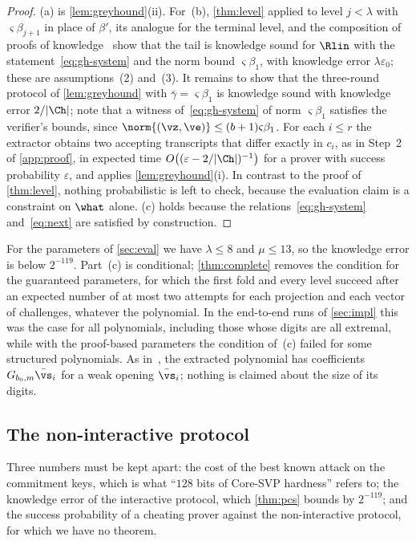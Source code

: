\begin{proof}
(a) is \cref{lem:greyhound}(ii). For~(b), \cref{thm:level} applied to level $j<\lambda$ with $\varsigma\beta_{j+1}$ in place of $\beta'$, its analogue for the terminal level, and the composition of proofs of knowledge~\cite{BS23} show that the tail is knowledge sound for $\Rlin$ with the statement~\eqref{eq:gh-system} and the norm bound $\varsigma\beta_1$, with knowledge error $\lambda\varepsilon_0$; these are assumptions~(2) and~(3). It remains to show that the three-round protocol of \cref{lem:greyhound} with $\bar\gamma=\varsigma\beta_1$ is knowledge sound with knowledge error $2/\lvert\Ch\rvert$; note that a witness of~\eqref{eq:gh-system} of norm $\varsigma\beta_1$ satisfies the verifier's bounds, since $\norm{(\vz,\ve)}\le(b+1)\varsigma\beta_1$. For each $i\le r$ the extractor obtains two accepting transcripts that differ exactly in $c_i$, as in Step~2 of \cref{app:proof}, in expected time $O\bigl((\varepsilon-2/\lvert\Ch\rvert)^{-1}\bigr)$ for a prover with success probability $\varepsilon$, and applies \cref{lem:greyhound}(i). In contrast to the proof of \cref{thm:level}, nothing probabilistic is left to check, because the evaluation claim is a constraint on $\what$ alone. (c) holds because the relations~\eqref{eq:gh-system} and~\eqref{eq:next} are satisfied by construction.
\end{proof}

For the parameters of \cref{sec:eval} we have $\lambda\le8$ and $\mu\le13$, so the knowledge error is below $2^{-119}$. Part~(c) is conditional; \cref{thm:complete} removes the condition for the guaranteed parameters, for which the first fold and every level succeed after an expected number of at most two attempts for each projection and each vector of challenges, whatever the polynomial. In the end-to-end runs of \cref{sec:impl} this was the case for all polynomials, including those whose digits are all extremal, while with the proof-based parameters the condition of~(c) failed for some structured polynomials. As in~\cite{NS24}, the extracted polynomial has coefficients $G_{b_0,m}\bar\vs_i$ for a weak opening $\bar\vs_i$; nothing is claimed about the size of its digits.

\subsection{The non-interactive protocol}\label{sec:fs}

Three numbers must be kept apart: the cost of the best known attack on the commitment keys, which is what ``$128$ bits of Core-SVP hardness'' refers to; the knowledge error of the interactive protocol, which \cref{thm:pcs} bounds by $2^{-119}$; and the success probability of a cheating prover against the non-interactive protocol, for which we have no theorem.

